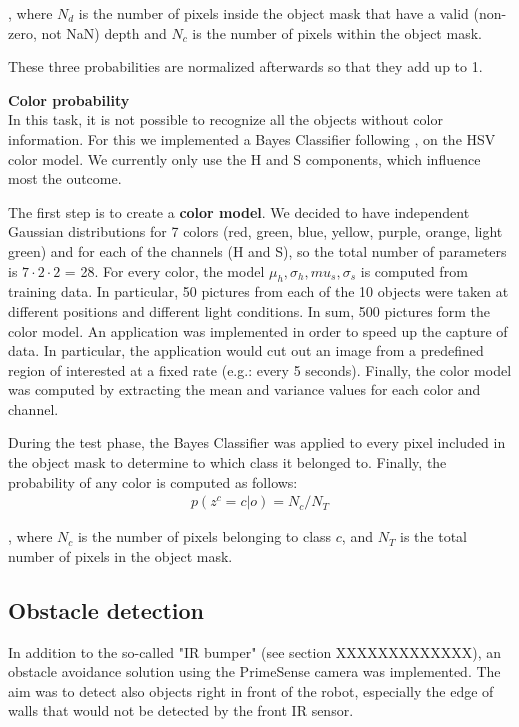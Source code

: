 , where $N_d$ is the number of pixels inside the object mask that have a valid (non-zero, not NaN) depth and $N_c$ is the number of pixels within the object mask.

These three probabilities are normalized afterwards so that they add up to 1.

\textbf{Color probability}\\
In this task, it is not possible to recognize all the objects without color information. For this we implemented a Bayes Classifier following \cite{Bayes}, on the HSV color model. We currently only use the H and S components, which influence most the outcome. 

The first step is to create a \textbf{color model}. We decided to have independent Gaussian distributions for 7 colors (red, green, blue, yellow, purple, orange, light green) and for each of the channels (H and S), so the total number of parameters is $7 \cdot 2 \cdot 2$ = 28. For every color, the model ${\mu_h, \sigma_h, mu_s, \sigma_s}$ is computed from training data. In particular, 50 pictures from each of the 10 objects were taken at different positions and different light conditions. In sum, 500 pictures form the color model. An application was implemented in order to speed up the capture of data. In particular, the application would cut out an image from a predefined region of interested at a fixed rate (e.g.: every 5 seconds). Finally, the color model was computed by extracting the mean and variance values for each color and channel.

During the test phase, the Bayes Classifier was applied to every pixel included in the object mask to determine to which class it belonged to. Finally, the probability of any color is computed as follows:
\begin{align}
p(z^c = c | o ) = N_c / N_T
\end{align}

, where $N_c$ is the number of pixels belonging to class $c$, and $N_T$ is the total number of pixels in the object mask. 

\subsection{Obstacle detection}

In addition to the so-called "IR bumper" (see section XXXXXXXXXXXXX), an obstacle avoidance solution using the PrimeSense camera was implemented. The aim was to detect also objects right in front of the robot, especially the edge of walls that would not be detected by the front IR sensor.

